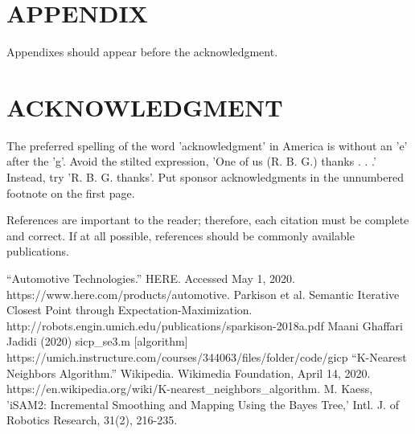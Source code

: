\documentclass[letterpaper, 10 pt, conference]{ieeeconf}  %
\begin{document}
\addtolength{\textheight}{-12cm}   %







\section*{APPENDIX}

Appendixes should appear before the acknowledgment.

\section*{ACKNOWLEDGMENT}

The preferred spelling of the word 'acknowledgment' in America is without an 'e' after the 'g'. Avoid the stilted expression, 'One of us (R. B. G.) thanks . . .'  Instead, try 'R. B. G. thanks'. Put sponsor acknowledgments in the unnumbered footnote on the first page.




References are important to the reader; therefore, each citation must be complete and correct. If at all possible, references should be commonly available publications.



\begin{thebibliography}{99}

 “Automotive Technologies.” HERE. Accessed May 1, 2020. https://www.here.com/products/automotive.
 Parkison et al. Semantic Iterative Closest Point through Expectation-Maximization. http://robots.engin.umich.edu/publications/sparkison-2018a.pdf
 Maani Ghaffari Jadidi (2020) sicp\_se3.m [algorithm] https://umich.instructure.com/courses/344063/files/folder/code/gicp
 “K-Nearest Neighbors Algorithm.” Wikipedia. Wikimedia Foundation, April 14, 2020. https://en.wikipedia.org/wiki/K-nearest\_neighbors\_algorithm.
 M. Kaess, 'iSAM2: Incremental Smoothing and Mapping Using the Bayes Tree,' Intl. J. of Robotics Research, 31(2), 216-235.


\end{thebibliography}
\end{document}
